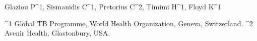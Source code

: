 Glaziou P^1, Sismanidis C^1, Pretorius C^2, Timimi H^1, Floyd K^1

^1 Global TB Programme, World Health Organization, Geneva, Switzerland.
^2 Avenir Health, Glastonbury, USA.
  